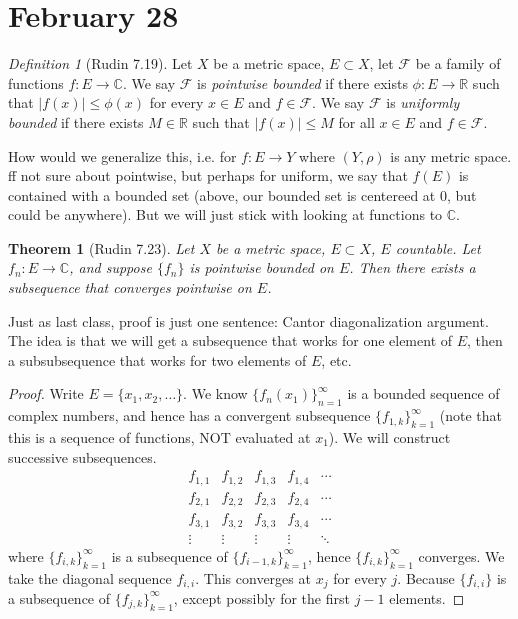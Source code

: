 \documentclass{article}
\theoremstyle{plain}
\newtheorem{theorem}{Theorem}
\theoremstyle{remark}
\newtheorem{definition}{Definition}
\newcommand{\R}{{\mathbb R}}
\newcommand{\C}{{\mathbb C}}
\begin{document}
\section{February 28}
\begin{definition}[Rudin 7.19]
	Let $X$ be a metric space, $E \subset X$, let $\mathcal{F}$
	be a family of functions $f \colon E \to \C$.
	We say $\mathcal{F}$ is \emph{pointwise bounded}
	if there exists $\phi \colon E \to \R$ such that
	$\lvert f(x) \rvert \leq \phi(x)$ for every $x \in E$ and $f \in \mathcal{F}$.
	We say $\mathcal{F}$ is \emph{uniformly bounded} if there exists
	$M \in \R$ such that $\lvert f(x) \rvert \leq M$ for all $x \in E$ and $f \in \mathcal{F}$.
\end{definition}
How would we generalize this, i.e. for $f \colon E \to Y$
where $(Y,\rho)$ is any metric space.
ff not sure about pointwise, but perhaps for uniform,
we say that $f(E)$ is contained with a bounded set
(above, our bounded set is centereed at $0$, but could be anywhere).
But we will just stick with looking at functions to $\C$.

\begin{theorem}[Rudin 7.23]
	Let $X$ be a metric space, $E \subset X$, $E$ countable.
	Let $f_n \colon E \to \C$, and suppose $\{f_n\}$ is pointwise bounded on $E$.
	Then there exists a subsequence that converges pointwise on $E$.
\end{theorem}
Just as last class, proof is just one sentence: Cantor diagonalization argument.
The idea is that we will get a subsequence that works for one element of $E$,
then a subsubsequence that works for two elements of $E$, etc.
\begin{proof}
	Write $E = \{x_1,x_2,\dots\}$.
	We know $\{f_n(x_1)\}_{n=1}^\infty$ is a bounded sequence of complex numbers,
	and hence has a convergent subsequence $\{f_{1,k}\}_{k=1}^\infty$
	(note that this is a sequence of functions, NOT evaluated at $x_1$).
	We will construct successive subsequences.
	\[
		\begin{matrix}
			f_{1,1} & f_{1,2} & f_{1,3} & f_{1,4} & \cdots\\
			f_{2,1} & f_{2,2} & f_{2,3} & f_{2,4} & \cdots\\
			f_{3,1} & f_{3,2} & f_{3,3} & f_{3,4} & \cdots\\
			\vdots & \vdots & \vdots & \vdots & \ddots
		\end{matrix}
	\]
	where $\{f_{i,k}\}_{k=1}^\infty$ is a subsequence of $\{f_{i-1,k}\}_{k=1}^\infty$,
	hence $\{f_{i,k}\}_{k=1}^\infty$ converges.
	We take the diagonal sequence $f_{i,i}$.
	This converges at $x_j$ for every $j$.
	Because $\{f_{i,i}\}$ is a subsequence of $\{f_{j,k}\}_{k=1}^\infty$,
	except possibly for the first $j-1$ elements.
\end{proof}
\end{document}
